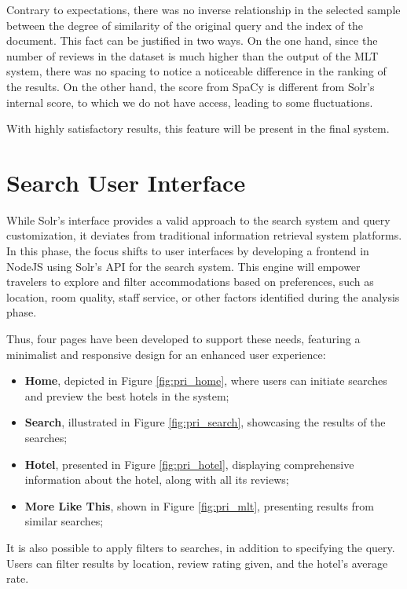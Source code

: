 \documentclass[sigconf]{acmart}
\begin{document}
Contrary to expectations, there was no inverse relationship in the selected sample between the degree of similarity of the original query and the index of the document. This fact can be justified in two ways. On the one hand, since the number of reviews in the dataset is much higher than the output of the MLT system, there was no spacing to notice a noticeable difference in the ranking of the results. On the other hand, the score from SpaCy is different from Solr's internal score, to which we do not have access, leading to some fluctuations.

With highly satisfactory results, this feature will be present in the final system.

\section{Search User Interface}

While Solr's interface provides a valid approach to the search system and query customization, it deviates from traditional information retrieval system platforms. In this phase, the focus shifts to user interfaces by developing a frontend in NodeJS \cite{NodeJS} using Solr's API \cite{Solr_api} for the search system. This engine will empower travelers to explore and filter accommodations based on preferences, such as location, room quality, staff service, or other factors identified during the analysis phase.

Thus, four pages have been developed to support these needs, featuring a minimalist and responsive design for an enhanced user experience:

\begin{itemize}
    \item \textbf{Home}, depicted in Figure \ref{fig:pri_home}, where users can initiate searches and preview the best hotels in the system;
    \item \textbf{Search}, illustrated in Figure \ref{fig:pri_search}, showcasing the results of the searches;
    \item \textbf{Hotel}, presented in Figure \ref{fig:pri_hotel}, displaying comprehensive information about the hotel, along with all its reviews;
    \item \textbf{More Like This}, shown in Figure \ref{fig:pri_mlt}, presenting results from similar searches;
\end{itemize}

It is also possible to apply filters to searches, in addition to specifying the query. Users can filter results by location, review rating given, and the hotel's average rate.
\end{document}
